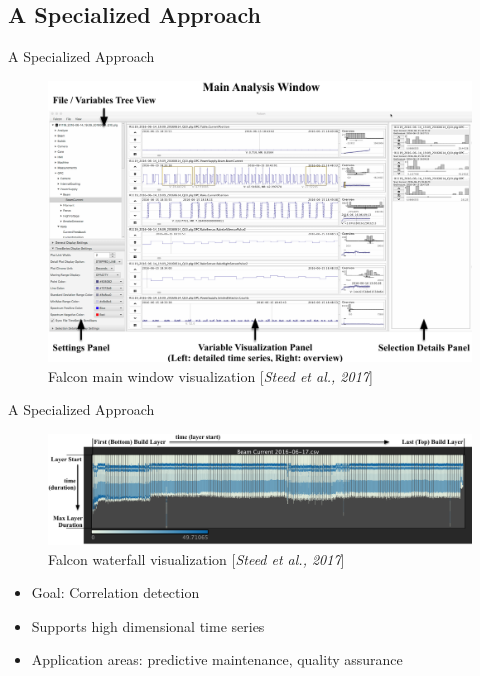 \documentclass[10pt]{beamer}
\begin{document}

\subsection{A Specialized Approach}
\begin{frame}{A Specialized Approach}
	\centering
	\begin{figure}[htbp]
		\includegraphics[scale=.2]{images/Falcon_main}
		\caption{Falcon main window visualization [\textit{Steed et al., 2017}]}
	\end{figure}
\end{frame}


\begin{frame}{A Specialized Approach}
	\centering
	\begin{figure}[htbp]
		\includegraphics[scale=.22]{images/Falcon_waterfall}
		\caption{Falcon waterfall visualization [\textit{Steed et al., 2017}]}
	\end{figure}
	\begin{itemize}
		\item Goal: Correlation detection
		\item Supports high dimensional time series
		\item Application areas: predictive maintenance, quality assurance
	\end{itemize}
\end{frame}
\end{document}
